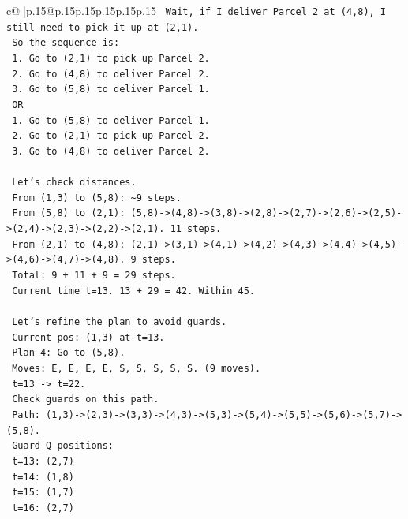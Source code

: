 \documentclass{article}
\begin{document}
{\begin{supertabular}{c@{$\;$}|p{.15\linewidth}@{}p{.15\linewidth}p{.15\linewidth}p{.15\linewidth}p{.15\linewidth}p{.15\linewidth}}
{{{\texttt{   Wait, if I deliver Parcel 2 at (4,8), I still need to pick it up at (2,1).} \\
\texttt{   So the sequence is:} \\
\texttt{   1. Go to (2,1) to pick up Parcel 2.} \\
\texttt{   2. Go to (4,8) to deliver Parcel 2.} \\
\texttt{   3. Go to (5,8) to deliver Parcel 1.} \\
\texttt{   OR} \\
\texttt{   1. Go to (5,8) to deliver Parcel 1.} \\
\texttt{   2. Go to (2,1) to pick up Parcel 2.} \\
\texttt{   3. Go to (4,8) to deliver Parcel 2.} \\
\\ 
\texttt{   Let's check distances.} \\
\texttt{   From (1,3) to (5,8): \textasciitilde{}9 steps.} \\
\texttt{   From (5,8) to (2,1): (5,8){-}>(4,8){-}>(3,8){-}>(2,8){-}>(2,7){-}>(2,6){-}>(2,5){-}>(2,4){-}>(2,3){-}>(2,2){-}>(2,1). 11 steps.} \\
\texttt{   From (2,1) to (4,8): (2,1){-}>(3,1){-}>(4,1){-}>(4,2){-}>(4,3){-}>(4,4){-}>(4,5){-}>(4,6){-}>(4,7){-}>(4,8). 9 steps.} \\
\texttt{   Total: 9 + 11 + 9 = 29 steps.} \\
\texttt{   Current time t=13. 13 + 29 = 42. Within 45.} \\
\\ 
\texttt{   Let's refine the plan to avoid guards.} \\
\texttt{   Current pos: (1,3) at t=13.} \\
\texttt{   Plan 4: Go to (5,8).} \\
\texttt{   Moves: E, E, E, E, S, S, S, S, S. (9 moves).} \\
\texttt{   t=13 {-}> t=22.} \\
\texttt{   Check guards on this path.} \\
\texttt{   Path: (1,3){-}>(2,3){-}>(3,3){-}>(4,3){-}>(5,3){-}>(5,4){-}>(5,5){-}>(5,6){-}>(5,7){-}>(5,8).} \\
\texttt{   Guard Q positions:} \\
\texttt{   t=13: (2,7)} \\
\texttt{   t=14: (1,8)} \\
\texttt{   t=15: (1,7)} \\
\texttt{   t=16: (2,7)} \\
}}}
\end{supertabular}}
\end{document}
